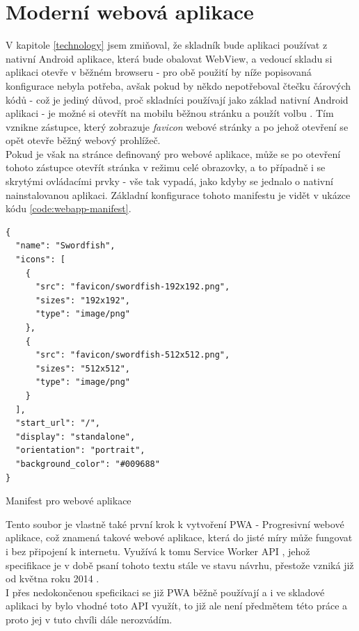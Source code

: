 \section{Moderní webová aplikace}

V kapitole \ref{technology} jsem zmiňoval, že skladník bude aplikaci používat z nativní Android aplikace, která bude obalovat WebView, a vedoucí skladu si aplikaci otevře v běžném browseru - pro obě použití by níže popisovaná konfigurace nebyla potřeba, avšak pokud by někdo nepotřeboval čtečku čárových kódů - což je jediný důvod, proč skladníci používají jako základ nativní Android aplikaci - je možné si otevřít na mobilu běžnou stránku a použít volbu . Tím vznikne zástupce, který zobrazuje \emph{favicon} webové stránky a po jehož otevření se opět otevře běžný webový prohlížeč.\\
Pokud je však na stránce definovaný  pro webové aplikace, může se po otevření tohoto zástupce otevřít stránka v režimu celé obrazovky, a to případně i se skrytými ovládacími prvky - vše tak vypadá, jako kdyby se jednalo o nativní nainstalovanou aplikaci. Základní konfigurace tohoto manifestu je vidět v ukázce kódu \ref{code:webapp-manifest}.

\begin{listing}[H]
\begin{verbatim}
{
  "name": "Swordfish",
  "icons": [
    {
      "src": "favicon/swordfish-192x192.png",
      "sizes": "192x192",
      "type": "image/png"
    },
    {
      "src": "favicon/swordfish-512x512.png",
      "sizes": "512x512",
      "type": "image/png"
    }
  ],
  "start_url": "/",
  "display": "standalone",
  "orientation": "portrait",
  "background_color": "#009688"
}

\end{verbatim}
\caption{Manifest pro webové aplikace} \label{code:webapp-manifest}
\end{listing}

Tento soubor je vlastně také první krok k vytvoření PWA - Progresivní webové aplikace, což znamená takové webové aplikace, která do jisté míry může fungovat i bez připojení k internetu. Využívá k tomu Service Worker API \cite{service-worker-api}, jehož specifikace je v době psaní tohoto textu stále ve stavu návrhu, přestože vzniká již od května roku 2014 \cite{service-worker-first}.\\
I přes nedokončenou speficikaci se již PWA běžně používají a i ve skladové aplikaci by bylo vhodné toto API využít, to již ale není předmětem této práce a proto jej v tuto chvíli dále nerozvádím.

